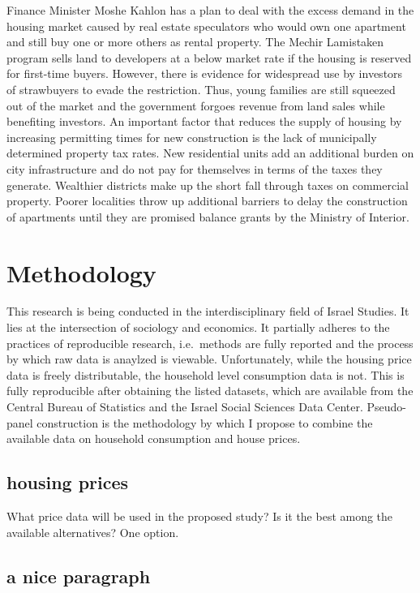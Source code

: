 \documentclass[12pt,a4paper,]{article}
\begin{document}
Finance Minister Moshe Kahlon has a plan to deal with the excess demand
in the housing market caused by real estate speculators who would own
one apartment and still buy one or more others as rental property. The
Mechir Lamistaken program sells land to developers at a below market
rate if the housing is reserved for first-time buyers. However, there is
evidence for widespread use by investors of strawbuyers to evade the
restriction. Thus, young families are still squeezed out of the market
and the government forgoes revenue from land sales while benefiting
investors. An important factor that reduces the supply of housing by
increasing permitting times for new construction is the lack of
municipally determined property tax rates. New residential units add an
additional burden on city infrastructure and do not pay for themselves
in terms of the taxes they generate. Wealthier districts make up the
short fall through taxes on commercial property. Poorer localities throw
up additional barriers to delay the construction of apartments until
they are promised balance grants by the Ministry of Interior.

\section{Methodology}\label{methodology}

This research is being conducted in the interdisciplinary field of
Israel Studies. It lies at the intersection of sociology and economics.
It partially adheres to the practices of reproducible research,
i.e.~methods are fully reported and the process by which raw data is
anaylzed is viewable. Unfortunately, while the housing price data is
freely distributable, the household level consumption data is not. This
is fully reproducible after obtaining the listed datasets, which are
available from the Central Bureau of Statistics and the Israel Social
Sciences Data Center. Pseudo-panel construction is the methodology by
which I propose to combine the available data on household consumption
and house prices.

\subsection{housing prices}\label{housing-prices}

What price data will be used in the proposed study? Is it the best among
the available alternatives? One option.

\subsection{a nice paragraph}\label{a-nice-paragraph}
\end{document}
